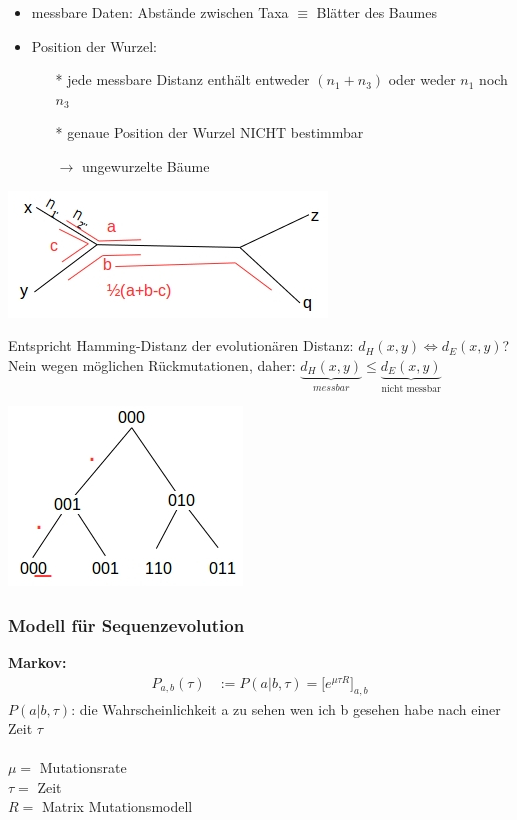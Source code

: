 \begin{itemize}
	\item messbare Daten: Abstände zwischen Taxa $\equiv$ Blätter des Baumes
	\item Position der Wurzel:
		\begin{itemize}
			\item[*] jede messbare Distanz enthält entweder $(n_1 + n_3)$ oder weder $n_1$ noch $n_3$
			\item[*] genaue Position der Wurzel NICHT bestimmbar
			\item[$\rightarrow$] ungewurzelte Bäume
		\end{itemize}
\end{itemize}

\begin{center}
	\includegraphics[scale=1]{lectures/161209/pix/pic2.jpg}		
\end{center}

Entspricht Hamming-Distanz der evolutionären Distanz: $d_H (x,y) \Leftrightarrow d_E (x,y)$?
Nein wegen möglichen Rückmutationen, daher: $\underbrace{d_H (x,y)}_{messbar} \leq \underbrace{d_E (x,y)}_{\text{nicht messbar}}$

\begin{center}
	\includegraphics[scale=1]{lectures/161209/pix/pic3.jpg}
\end{center}

\newpage	

\subsubsection{Modell für Sequenzevolution}
\textbf{Markov:}
\begin{align*}
	P_{a,b}(\tau) &:= P(a | b, \tau) = \biggl[e^{\mu \tau R} \biggr]_{a,b}
\end{align*}
$P(a | b, \tau)$: die Wahrscheinlichkeit a zu sehen wen ich b gesehen habe nach einer Zeit $\tau$
\\\\
$\mu = $ Mutationsrate\\
$\tau = $ Zeit\\
$R = $ Matrix Mutationsmodell

